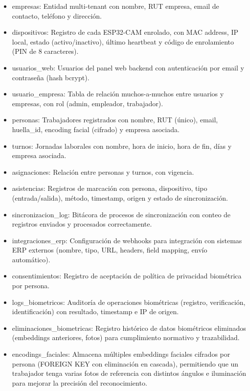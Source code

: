 \begin{itemize}
    \item empresas: Entidad multi-tenant con nombre, RUT empresa, email de contacto, teléfono y dirección.
    \item dispositivos: Registro de cada ESP32-CAM enrolado, con MAC address, IP local, estado (activo/inactivo), último heartbeat y código de enrolamiento (PIN de 8 caracteres).
    \item usuarios\_web: Usuarios del panel web backend con autenticación por email y contraseña (hash bcrypt).
    \item usuario\_empresa: Tabla de relación muchos-a-muchos entre usuarios y empresas, con rol (admin, empleador, trabajador).
    \item personas: Trabajadores registrados con nombre, RUT (único), email, huella\_id, encoding facial (cifrado) y empresa asociada.
    \item turnos: Jornadas laborales con nombre, hora de inicio, hora de fin, días y empresa asociada.
    \item asignaciones: Relación entre personas y turnos, con vigencia.
    \item asistencias: Registros de marcación con persona, dispositivo, tipo (entrada/salida), método, timestamp, origen y estado de sincronización.
    \item sincronizacion\_log: Bitácora de procesos de sincronización con conteo de registros enviados y procesados correctamente.
    \item integraciones\_erp: Configuración de webhooks para integración con sistemas ERP externos (nombre, tipo, URL, headers, field mapping, envío automático).
    \item consentimientos: Registro de aceptación de política de privacidad biométrica por persona.
    \item logs\_biometricos: Auditoría de operaciones biométricas (registro, verificación, identificación) con resultado, timestamp e IP de origen.
    \item eliminaciones\_biometricas: Registro histórico de datos biométricos eliminados (embeddings anteriores, fotos) para cumplimiento normativo y trazabilidad.
    \item encodings\_faciales: Almacena múltiples embeddings faciales cifrados por persona (FOREIGN KEY con eliminación en cascada), permitiendo que un trabajador tenga varias fotos de referencia con distintos ángulos e iluminación para mejorar la precisión del reconocimiento.
\end{itemize}

